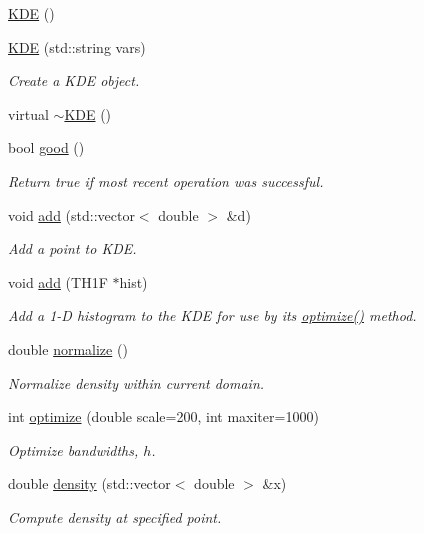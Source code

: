 \begin{CompactItemize}
\item 
\hyperlink{classKDE_a0}{KDE} ()
\item 
\hyperlink{classKDE_a1}{KDE} (std::string vars)
\begin{CompactList}\small\item\em Create a KDE object. \item\end{CompactList}\item 
virtual \hyperlink{classKDE_a2}{$\sim$KDE} ()
\item 
bool \hyperlink{classKDE_a3}{good} ()
\begin{CompactList}\small\item\em Return true if most recent operation was successful. \item\end{CompactList}\item 
void \hyperlink{classKDE_a4}{add} (std::vector$<$ double $>$ \&d)
\begin{CompactList}\small\item\em Add a point to KDE. \item\end{CompactList}\item 
void \hyperlink{classKDE_a5}{add} (TH1F $\ast$hist)
\begin{CompactList}\small\item\em Add a 1-D histogram to the KDE for use by its \hyperlink{classKDE_a7}{optimize()} method. \item\end{CompactList}\item 
double \hyperlink{classKDE_a6}{normalize} ()
\begin{CompactList}\small\item\em Normalize density within current domain. \item\end{CompactList}\item 
int \hyperlink{classKDE_a7}{optimize} (double scale=200, int maxiter=1000)
\begin{CompactList}\small\item\em Optimize bandwidths, $h$. \item\end{CompactList}\item 
double \hyperlink{classKDE_a8}{density} (std::vector$<$ double $>$ \&x)
\begin{CompactList}\small\item\em Compute density at specified point. \item\end{CompactList}\item 

\end{CompactItemize}

